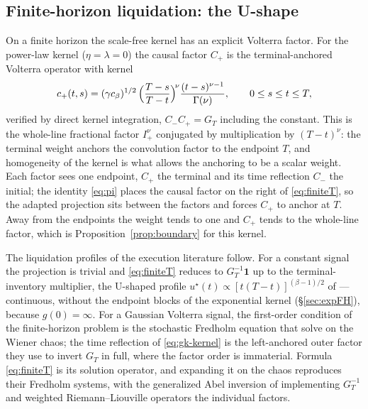 \documentclass[11pt]{article}
\theoremstyle{plain}
\theoremstyle{definition}
\theoremstyle{remark}
\begin{document}
\subsection{Finite-horizon liquidation: the U-shape}\label{sec:powerlawFH}

On a finite horizon the scale-free kernel has an explicit Volterra factor. For the power-law kernel ($\eta=\lambda=0$) the causal factor $C_+$ is the terminal-anchored Volterra operator with kernel
\begin{equation}\label{eq:gk-kernel}
c_+(t,s) = (\gamma c_\beta)^{1/2}\,\Bigl(\frac{T-s}{T-t}\Bigr)^{\!\nu}\frac{(t-s)^{\nu-1}}{\Gamma(\nu)},
\qquad 0\le s\le t\le T,
\end{equation}
verified by direct kernel integration, $C_-C_+=G_T$ including the constant. This is the whole-line fractional factor $I^\nu_+$ conjugated by multiplication by $(T-t)^\nu$: the terminal weight anchors the convolution factor to the endpoint $T$, and homogeneity of the kernel is what allows the anchoring to be a scalar weight. Each factor sees one endpoint, $C_+$ the terminal and its time reflection $C_-$ the initial; the identity \eqref{eq:pi} places the causal factor on the right of \eqref{eq:finiteT}, so the adapted projection sits between the factors and forces $C_+$ to anchor at $T$. Away from the endpoints the weight tends to one and $C_+$ tends to the whole-line factor, which is Proposition~\ref{prop:boundary} for this kernel.

The liquidation profiles of the execution literature follow. For a constant signal the projection is trivial and \eqref{eq:finiteT} reduces to $G_T^{-1}\mathbf 1$ up to the terminal-inventory multiplier, the U-shaped profile $u^\star(t)\propto[t(T-t)]^{(\beta-1)/2}$ of \citet[Ex.~2.30]{GatheralSchiedSlynko2012} --- continuous, without the endpoint blocks of the exponential kernel (\S\ref{sec:expFH}), because $g(0)=\infty$. For a Gaussian Volterra signal, the first-order condition of the finite-horizon problem is the stochastic Fredholm equation that \citet{FordeSanchezSmith2022} solve on the Wiener chaos; the time reflection of \eqref{eq:gk-kernel} is the left-anchored outer factor they use to invert $G_T$ in full, where the factor order is immaterial. Formula \eqref{eq:finiteT} is its solution operator, and expanding it on the chaos reproduces their Fredholm systems, with the generalized Abel inversion of \citet{ChakrabartiGeorge1994} implementing $G_T^{-1}$ and weighted Riemann--Liouville operators the individual factors.

\end{document}
